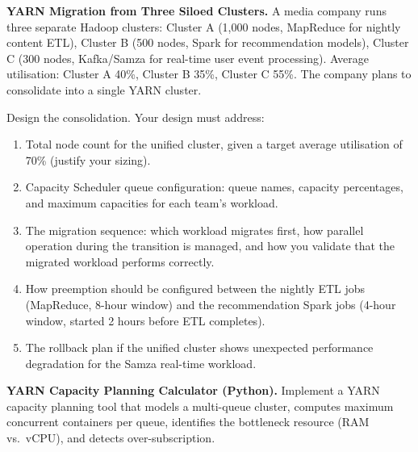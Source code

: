 \dpr \textbf{YARN Migration from Three Siloed Clusters.}
A media company runs three separate Hadoop clusters: Cluster A
(1{,}000 nodes, MapReduce for nightly content ETL), Cluster B
(500 nodes, Spark for recommendation models), Cluster C
(300 nodes, Kafka/Samza for real-time user event processing).
Average utilisation: Cluster A 40\%, Cluster B 35\%, Cluster C 55\%.
The company plans to consolidate into a single YARN cluster.

Design the consolidation. Your design must address:
\begin{enumerate}[label=(\alph*)]
  \item Total node count for the unified cluster, given a target
        average utilisation of 70\% (justify your sizing).
  \item Capacity Scheduler queue configuration: queue names, capacity
        percentages, and maximum capacities for each team's workload.
  \item The migration sequence: which workload migrates first, how
        parallel operation during the transition is managed, and how
        you validate that the migrated workload performs correctly.
  \item How preemption should be configured between the nightly ETL
        jobs (MapReduce, 8-hour window) and the recommendation Spark
        jobs (4-hour window, started 2 hours before ETL completes).
  \item The rollback plan if the unified cluster shows unexpected
        performance degradation for the Samza real-time workload.
\end{enumerate}

\bigskip
{}

\pe \textbf{YARN Capacity Planning Calculator (Python).}
Implement a YARN capacity planning tool that models a multi-queue
cluster, computes maximum concurrent containers per queue, identifies
the bottleneck resource (RAM vs.\ vCPU), and detects over-subscription.

